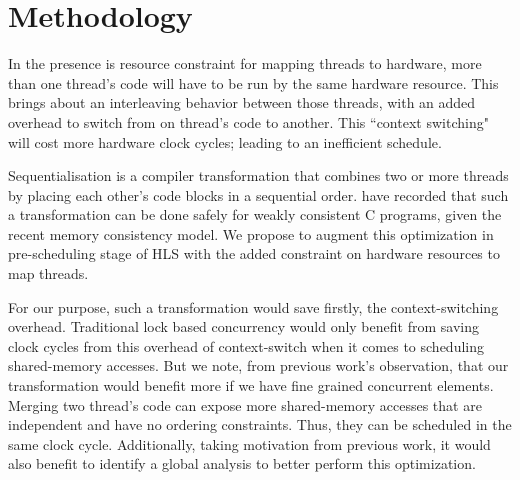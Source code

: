 \documentclass[sigplan,10pt,review]{acmart}
\begin{document}
    \section{Methodology}

        In the presence is resource constraint for mapping threads to hardware, more than one thread's code will have to be run by the same hardware resource.
        This brings about an interleaving behavior between those threads, with an added overhead to switch from on thread's code to another.
        This ``context switching" will cost more hardware clock cycles; leading to an inefficient schedule.

        Sequentialisation is a compiler transformation that combines two or more threads by placing each other's code blocks in a sequential order. 
        \cite{DBLP:journals/pcs/MoiseenkoPK21} have recorded that such a transformation can be done safely for weakly consistent C programs, given the recent memory consistency model.
        We propose to augment this optimization in pre-scheduling stage of HLS with the added constraint on hardware resources to map threads.

        For our purpose, such a transformation  would save firstly, the context-switching overhead.
        Traditional lock based concurrency would only benefit from saving clock cycles from this overhead of context-switch when it comes to scheduling shared-memory accesses.
        But we note, from previous work's observation, that our transformation would benefit more if we have fine grained concurrent elements. 
        Merging two thread's code can expose more shared-memory accesses that are independent and have no ordering constraints. Thus, they can be scheduled in the same clock cycle. 
        Additionally, taking motivation from previous work, it would also benefit to identify a global analysis to better perform this optimization. 
        
\end{document}
